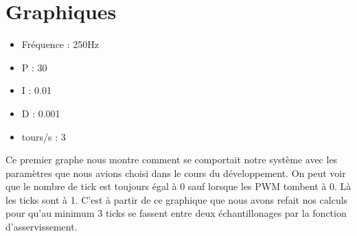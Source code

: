 \documentclass[
	a4paper,									%
	11pt,										%
	twoside,									%
	openright,									%
	notitlepage,									%
	parskip=half,								%
]{scrreprt}										%
\begin{document}
\section{Graphiques}

\begin{center}
    



\begin{itemize}
    \item Fréquence : 250Hz
    \item P : 30
    \item I : 0.01
    \item D : 0.001
    \item tours/s : 3
\end{itemize}
\end{center}

Ce premier graphe nous montre comment se comportait notre système avec les paramètres que nous avions choisi dans le cours 
du développement. On peut voir que le nombre de tick est toujours égal à 0 sauf lorsque les PWM tombent à 0. Là les ticks sont
à 1. C'est à partir de ce graphique que nous avons refait nos calculs pour qu'au minimum 3 ticks se fassent entre deux 
échantillonages par la fonction d'asservissement. \par
\end{document}
